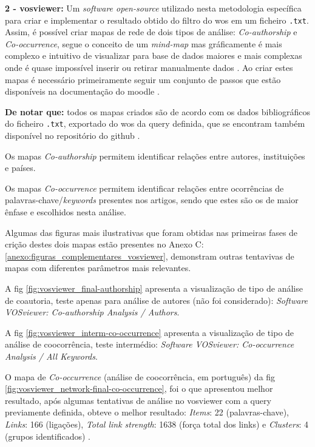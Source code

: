 {\setlength{\parindent}{0pt}
\textbf{ 2 - \gls{vosviewer}:}
}
Um  \textit{ software open-source} utilizado nesta metodologia específica para criar  e implementar o resultado obtido do filtro do \gls{wos} em um ficheiro \verb|.txt|.
Assim, é possível criar mapas de rede de dois tipos de análise: \textit{Co-authorship} e \textit{Co-occurrence}, segue o conceito de um \textit{mind-map} mas gráficamente é mais complexo e intuitivo de visualizar para base de dados maiores e mais complexas onde é quase impossível inserir ou retirar manualmente dados \cite{VOSviewer2026}.
Ao criar estes mapas é necessário primeiramente seguir um conjunto de passos que estão disponíveis na documentação do \gls{moodle} \cite{MoodleEnunciado}.

\textbf{De notar que:} todos os mapas criados são de acordo com os dados bibliográficos do ficheiro \verb|.txt|, exportado do \gls{wos} da \gls{query} definida, que se encontram também disponível no repositório do \gls{github} \cite{JunqueiraDevEduardoRepositório}.

Os mapas \textit{Co-authorship} permitem identificar relações entre autores, instituições e países.

Os mapas \textit{Co-occurrence} permitem identificar relações entre ocorrências de palavras-chave/\textit{keywords} presentes nos artigos, sendo que estes são os de maior ênfase e escolhidos nesta análise.


Algumas das figuras mais ilustrativas que foram obtidas nas primeiras fases de crição destes dois mapas estão presentes no Anexo C: \ref{anexo:figuras_complementares_vosviewer}, demonstram outras tentavivas de mapas com diferentes parâmetros mais relevantes.


A \gls{fig} \ref{fig:vosviewer_final-authorship} apresenta a visualização  de tipo de análise de coautoria, teste apenas para análise de autores (não foi considerado): \textit{Software VOSviewer: Co-authorship Analysis / Authors}.

A \gls{fig} \ref{fig:vosviewer_interm-co-occurrence} apresenta a visualização de tipo de análise de coocorrência, teste intermédio: \textit{Software VOSviewer: Co-occurrence Analysis / All Keywords}.


O mapa de \textit{Co-occurrence} (análise de coocorrência, em português) da  \gls{fig} \ref{fig:vosviewer_network-final-co-occurrence}, foi o que apresentou melhor resultado, após algumas tentativas de análise no \gls{vosviewer} com a \gls{query} previamente definida, obteve o melhor resultado: \textit{Items}: 22 (palavras-chave), \textit{Links}: 166 (ligações), \textit{Total link strength}: 1638 (força total dos links) e \textit{Clusters}: 4 (grupos identificados) \cite{VosViewerResult2025}.




